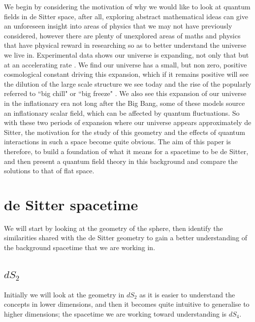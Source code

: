 \documentclass[a4paper,11pt]{article}
\numberwithin{equation}{section}
\numberwithin{figure}{section}
\begin{document}
\begin{large}
We begin by considering the motivation of why we would like to look at quantum fields in de Sitter space, after all, exploring abstract mathematical ideas can give an unforeseen insight into areas of physics that we may not have previously considered, however there are plenty of unexplored areas of maths and physics that have physical reward in researching so as to better understand the universe we live in. Experimental data shows our universe is expanding, not only that but at an accelerating rate \cite{supernova1,supernova2}. We find our universe has a small, but non zero, positive cosmological constant \cite{cosmoconst} driving this expansion, which if it remains positive will see the dilution of the large scale structure we see today and the rise of the popularly referred to ``big chill" or ``big freeze" \cite{future structure}. We also see this expansion of our universe in the inflationary era \cite{inflation1,inflation2} not long after the Big Bang, some of these models source an inflationary scalar field, which can be affected by quantum fluctuations. So with these two periods of expansion where our universe appears approximately de Sitter, the motivation for the study of this geometry and the effects of quantum interactions in such a space become quite obvious. The aim of this paper is therefore, to build a foundation of what it means for a spacetime to be de Sitter, and then present a quantum field theory in this background and compare the solutions to that of flat space.


\newpage 


\section{de Sitter spacetime}


We will start by looking at the geometry of the sphere, then identify the similarities shared with the de Sitter geometry to gain a better understanding of the background spacetime that we are working in. 

\vspace{0.5cm}

\subsection{$dS_2$}


Initially we will look at the geometry in $dS_2$ as it is easier to understand the concepts in lower dimensions, and then it becomes quite intuitive to generalise to higher dimensions; the spacetime we are working toward understanding is $dS_4$.



\end{large}
\end{document}
